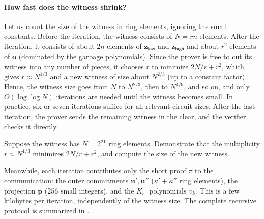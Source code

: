 \documentclass[../../book.tex]{subfiles}
\begin{document}
\begin{algoproto}[ht]
\begin{mdframed}[linecolor=black, linewidth=1pt,
                     skipabove=10pt, skipbelow=10pt,
                     innerleftmargin=5pt, innerrightmargin=5pt]
\begin{minipage}[t]{0.45\linewidth}
\begin{algoen}
            \end{algoen}
        \end{minipage}
    \end{mdframed}
    \caption{One iteration of the main protocol of LaBRADOR~\cite[Fig.~2]{C:BeuSei23}. Instead of sending its last message, the prover outputs the new witness $(\mathbf{s}_i')_{i \in [r']}$, and the verifier outputs the new statement: the family $\mathcal{F}'$ consists of the $\kappa + \kappa' + \kappa'' + 3$ constraints $\mathbf{A}\mathbf{z} = \sum_i c_i\mathbf{t}_i$, $\mathbf{u}' = \mathbf{B}\mathbf{t} + \mathbf{C}\mathbf{g}$, $\mathbf{u}'' = \mathbf{D}\mathbf{h}$, and the three garbage equations of , all rewritten in terms of the new witness. Constant-coefficient constraints are not needed. We highlight changes from .}
    \label{fig:labrador-main}
\end{algoproto}

\paragraph{How fast does the witness shrink?}
Let us count the size of the witness in ring elements, ignoring the small constants.
Before the iteration, the witness consists of $N = rn$ elements.
After the iteration, it consists of about $2n$ elements of $\mathbf{z}_{\mathsf{low}}$ and $\mathbf{z}_{\mathsf{high}}$ and about $r^2$ elements of $\mathbf{o}$ (dominated by the garbage polynomials).
Since the prover is free to cut its witness into any number of pieces, it chooses $r$ to minimize $2N/r + r^2$, which gives $r \approx N^{1/3}$ and a new witness of size about $N^{2/3}$ (up to a constant factor).
Hence, the witness size goes from $N$ to $N^{2/3}$, then to $N^{4/9}$, and so on, and only $O(\log \log N)$ iterations are needed until the witness becomes small.
In practice, six or seven iterations suffice for all relevant circuit sizes.
After the last iteration, the prover sends the remaining witness in the clear, and the verifier checks it directly.

\begin{exercise}\label{exercise:labrador-shrink}
    Suppose the witness has $N = 2^{21}$ ring elements. Demonstrate that the multiplicity $r \approx N^{1/3}$ minimizes $2N/r + r^2$, and compute the size of the new witness.
\end{exercise}

Meanwhile, each iteration contributes only the short proof $\pi$ to the communication: the outer commitments $\mathbf{u}', \mathbf{u}''$ ($\kappa' + \kappa''$ ring elements), the projection $\mathbf{p}$ ($256$ small integers), and the $K_{\mathsf{ct}}$ polynomials $v_k$.
This is a few kilobytes per iteration, independently of the witness size.
The complete recursive protocol is summarized in .
\end{document}
